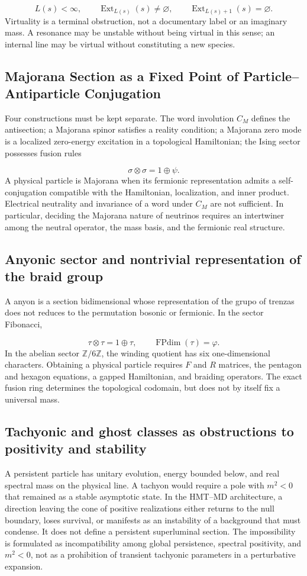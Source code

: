 \[
L(s)<\infty,
\qquad
\operatorname{Ext}_{L(s)}(s)\ne\varnothing,
\qquad
\operatorname{Ext}_{L(s)+1}(s)=\varnothing.
\]
Virtuality is a terminal obstruction, not a documentary label or an imaginary mass. A resonance may be unstable without being virtual in this sense; an internal line may be virtual without constituting a new species.

\subsection{Majorana Section as a Fixed Point of Particle–Antiparticle Conjugation}
Four constructions must be kept separate. The word involution \(C_M\) defines the antisection; a Majorana spinor satisfies a reality condition; a Majorana zero mode is a localized zero-energy excitation in a topological Hamiltonian; the Ising sector possesses fusion rules

\[
\sigma\otimes\sigma=1\oplus\psi.
\]
A physical particle is Majorana when its fermionic representation admits a self-conjugation compatible with the Hamiltonian, localization, and inner product. Electrical neutrality and invariance of a word under \(C_M\) are not sufficient. In particular, deciding the Majorana nature of neutrinos requires an intertwiner among the neutral operator, the mass basis, and the fermionic real structure.

\subsection{Anyonic sector and nontrivial representation of the braid group}
A anyon is a section bidimensional whose representation of the grupo of trenzas does not  reduces to the permutation bosonic or fermionic. In the sector Fibonacci,

\[
\tau\otimes\tau=1\oplus\tau,
\qquad
\operatorname{FPdim}(\tau)=\varphi.
\]
In the abelian sector \(\mathbb Z/6\mathbb Z\), the winding quotient has six one-dimensional characters. Obtaining a physical particle requires \(F\) and \(R\) matrices, the pentagon and hexagon equations, a gapped Hamiltonian, and braiding operators. The exact fusion ring determines the topological codomain, but does not by itself fix a universal mass.

\subsection{Tachyonic and ghost classes as obstructions to positivity and stability}
A persistent particle has unitary evolution, energy bounded below, and real spectral mass on the physical line. A tachyon would require a pole with \(m^2<0\) that remained as a stable asymptotic state. In the HMT--MD architecture, a direction leaving the cone of positive realizations either returns to the null boundary, loses survival, or manifests as an instability of a background that must condense. It does not define a persistent superluminal section. The impossibility is formulated as incompatibility among global persistence, spectral positivity, and \(m^2<0\), not as a prohibition of transient tachyonic parameters in a perturbative expansion.

